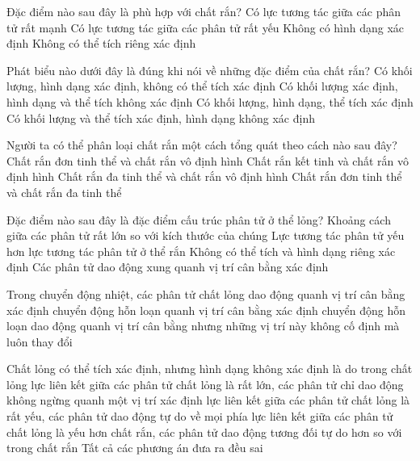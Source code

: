 \begin{ex}
Đặc điểm nào sau đây là phù hợp với chất rắn?
\choice
{\True Có lực tương tác giữa các phân tử rất mạnh}
{ Có lực tương tác giữa các phân tử rất yếu}
{ Không có hình dạng xác định}
{ Không có thể tích riêng xác định}
\loigiai{ }
\end{ex}


\begin{ex}
Phát biểu nào dưới đây là đúng khi nói về những đặc điểm của chất rắn?
\choice
{ Có khối lượng, hình dạng xác định, không có thể tích xác định}
{ Có khối lượng xác định, hình dạng và thể tích không xác định}
{\True Có khối lượng, hình dạng, thể tích xác định}
{ Có khối lượng và thể tích xác định, hình dạng không xác định}
\loigiai{ }
\end{ex}


\begin{ex}
Người ta có thể phân loại chất rắn một cách tổng quát theo cách nào sau đây?
\choice
{ Chất rắn đơn tinh thể và chất rắn vô định hình}
{\True Chất rắn kết tinh và chất rắn vô định hình}
{ Chất rắn đa tinh thể và chất rắn vô định hình}
{ Chất rắn đơn tinh thể và chất rắn đa tinh thể}
\loigiai{ }
\end{ex}


\begin{ex} 
Đặc điểm nào sau đây là đặc điểm cấu trúc phân tử ở thể lỏng?
\choice
{ Khoảng cách giữa các phân tử rất lớn so với kích thước của chúng}
{\True Lực tương tác phân tử yếu hơn lực tương tác phân tử ở thể rắn}
{ Không có thể tích và hình dạng riêng xác định}
{ Các phân tử dao động xung quanh vị trí cân bằng xác định}
\loigiai{ }
\end{ex}


\begin{ex} 
Trong chuyển động nhiệt, các phân tử chất lỏng
\choice
{ dao động quanh vị trí cân bằng xác định}
{ chuyển động hỗn loạn quanh vị trí cân bằng xác định}
{ chuyển động hỗn loạn}
{\True dao động quanh vị trí cân bằng nhưng những vị trí này không cố định mà luôn thay đổi}
\loigiai{ }
\end{ex}


\begin{ex}
Chất lỏng có thể tích xác định, nhưng hình dạng không xác định là do trong chất lỏng
\choice
{ lực liên kết giữa các phân tử chất lỏng là rất lớn, các phân tử chỉ dao động không ngừng quanh một vị trí xác định}
{ lực liên kết giữa các phân tử chất lỏng là rất yếu, các phân tử dao động tự do về mọi phía}
{\True lực liên kết giữa các phân tử chất lỏng là yếu hơn chất rắn, các phân tử dao động tương đối tự do hơn so với trong chất rắn}
{ Tất cả các phương án đưa ra đều sai}
\loigiai{ }
\end{ex}



